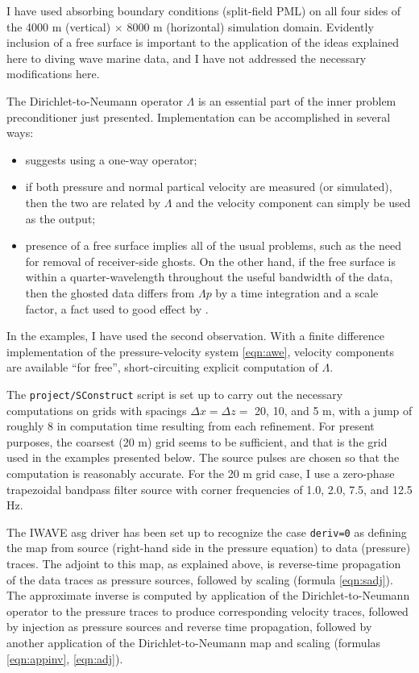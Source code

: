 I have used absorbing boundary conditions (split-field PML) on all four sides of the 4000 m (vertical) $\times$ 8000 m (horizontal) simulation domain. Evidently inclusion of a free surface is important to the application of the ideas explained here to diving wave marine data, and I have not addressed the necessary modifications here. 

The Dirichlet-to-Neumann operator $\Lambda$ is an essential part of the inner problem preconditioner just presented. Implementation can be accomplished in several ways:
\begin{itemize}
\item \cite{tenKroode:12} suggests using a one-way operator;
\item if both pressure and normal partical velocity are measured (or simulated), then the two are related by $\Lambda$ and the velocity component can simply be used as the output;
\item presence of a free surface implies all of the usual problems, such as the need for removal of receiver-side ghosts. On the other hand, if the free surface is within a quarter-wavelength throughout the useful bandwidth of the data, then the ghosted data differs from $\Lambda p$ by a time integration and a scale factor, a fact used to good effect by \cite{HouSymes:15}.
\end{itemize}

In the examples, I have used the second observation. With a finite difference implementation of the pressure-velocity system \ref{eqn:awe}, velocity components are available ``for free'', short-circuiting explicit computation of $\Lambda$.

The  {\tt project/SConstruct} script is set up to carry out the necessary computations on grids with spacings $\Delta x = \Delta z = $ 20, 10, and 5 m, with a jump of roughly 8 in computation time resulting from each refinement. For present purposes, the coarsest (20 m) grid seems to be sufficient, and that is the grid used in the examples presented below. The source pulses are chosen so that the computation is reasonably accurate. For the 20 m grid case, I use a zero-phase trapezoidal bandpass filter source with corner frequencies of 1.0, 2.0, 7.5, and 12.5 Hz.

The IWAVE asg driver has been set up to recognize the case {\tt deriv=0} as defining the map from source (right-hand side in the pressure equation) to data (pressure) traces. The adjoint to this map, as explained above, is reverse-time propagation of the data traces as pressure sources, followed by scaling (formula \ref{eqn:sadj}). The approximate inverse is computed by application of the Dirichlet-to-Neumann operator to the pressure traces to produce corresponding velocity traces, followed by injection as pressure sources and reverse time propagation, followed by another application of the Dirichlet-to-Neumann map and scaling (formulas \ref{eqn:appinv}, \ref{eqn:adj}).

